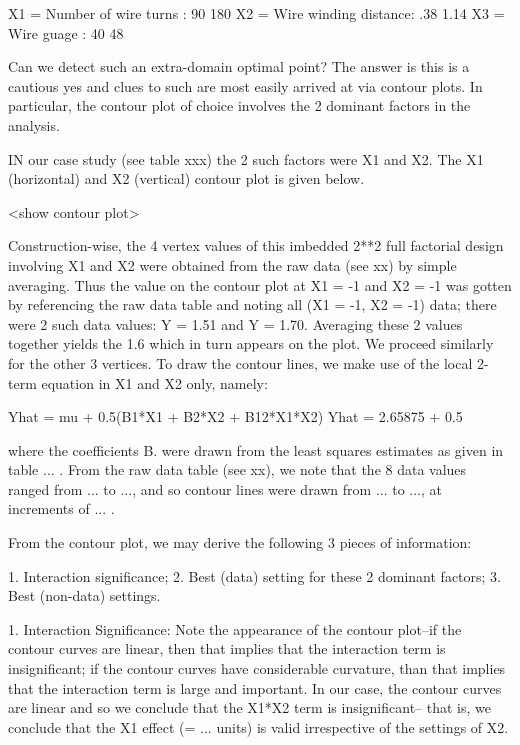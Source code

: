    X1 = Number of wire turns :         90        180
   X2 = Wire winding distance:        .38        1.14
   X3 = Wire guage           :         40         48

Can we detect such an extra-domain optimal point?
The answer is this is a cautious yes and clues to
such are most easily arrived at via contour plots.
In particular, the contour plot of choice involves
the 2 dominant factors in the analysis.

IN our case study (see table xxx) the 2 such factors
were X1 and X2.
The X1 (horizontal) and X2 (vertical) contour plot is given below.

<show contour plot>

Construction-wise,
the 4 vertex values of this imbedded 2**2 full
factorial design involving X1 and X2 were obtained
from the raw data (see xx) by simple averaging.
Thus the value on the contour plot at X1 = -1 and
X2 = -1 was gotten by referencing the raw data
table and noting all (X1 = -1, X2 = -1) data;
there were 2 such data values: Y = 1.51  and Y = 1.70.
Averaging these 2 values together yields
the 1.6 which in turn appears on the plot.  We proceed
similarly for the other 3 vertices.  To draw the
contour lines, we make use of the local 2-term equation
in X1 and X2 only, namely:

   Yhat = mu + 0.5(B1*X1 + B2*X2 + B12*X1*X2)
   Yhat = 2.65875 + 0.5

where the coefficients B. were drawn from the
least squares estimates as given in table ...  .
From the raw data table (see xx), we note that the
8 data values ranged from ...  to ..., and so
contour lines were drawn from ...  to ..., at
increments of ...  .

From the contour plot, we may derive the following
3 pieces of information:

   1. Interaction significance;
   2. Best (data) setting for these 2 dominant factors;
   3. Best (non-data) settings.

1. Interaction Significance:
   Note the appearance of the contour plot--if the
   contour curves are linear, then that implies
   that the interaction term is insignificant; if
   the contour curves have considerable curvature,
   than that implies that the interaction term is
   large and important.  In our case, the contour
   curves are linear and so we conclude that the
   X1*X2 term is insignificant-- that is, we
   conclude that the X1 effect (= ...  units) is
   valid irrespective of the settings of X2.

